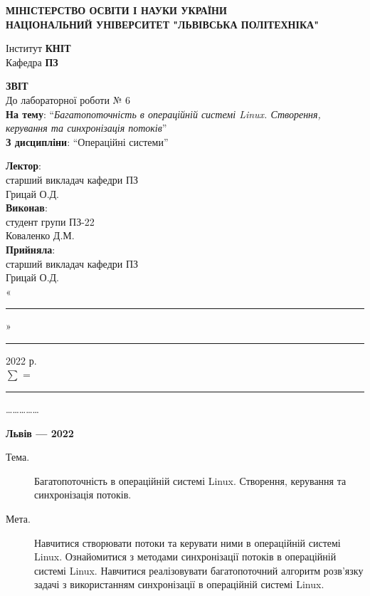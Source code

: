 \documentclass{article}
\newcommand\subject{Операційні системи}
\newcommand\lecturer{старший викладач кафедри ПЗ\\Грицай О.Д.}
\newcommand\teacher{старший викладач кафедри ПЗ\\Грицай О.Д.}
\newcommand\mygroup{ПЗ-22}
\newcommand\lab{6}
\newcommand\theme{Багатопоточність в операційній системі Linux. Створення,
	керування та синхронізація потоків}
\newcommand\purpose{Навчитися створювати потоки та керувати ними в операційній
	системі Linux. Ознайомитися з методами синхронізації потоків в операційній
	системі Linux. Навчитися реалізовувати багатопоточний алгоритм розв’язку
	задачі з використанням синхронізації в операційній системі Linux}
\begin{document}
\begin{normalsize}
	\begin{titlepage}
		\thispagestyle{empty}
		\begin{center}
			\textbf{МІНІСТЕРСТВО ОСВІТИ І НАУКИ УКРАЇНИ\\
				НАЦІОНАЛЬНИЙ УНІВЕРСИТЕТ "ЛЬВІВСЬКА ПОЛІТЕХНІКА"}
		\end{center}
		\begin{flushright}
			Інститут \textbf{КНІТ}\\
			Кафедра \textbf{ПЗ}
		\end{flushright}
		\vspace{200pt}
		\begin{center}
			\textbf{ЗВІТ}\\
			\vspace{10pt}
			До лабораторної роботи № \lab\\
			\textbf{На тему}: “\textit{\theme}”\\
			\textbf{З дисципліни}: “\subject”
		\end{center}
		\vspace{112pt}
		\begin{flushright}
			
			\textbf{Лектор}:\\
			\lecturer\\
			\vspace{28pt}
			\textbf{Виконав}:\\
			
			студент групи \mygroup\\
			Коваленко Д.М.\\
			\vspace{28pt}
			\textbf{Прийняла}:\\
			
			\teacher\\
			
			\vspace{28pt}
			«\rule{1cm}{0.15mm}» \rule{1.5cm}{0.15mm} 2022 р.\\
			$\sum$ = \rule{1cm}{0.15mm}……………\\
			
		\end{flushright}
		\vspace{\fill}
		\begin{center}
			\textbf{Львів — 2022}
		\end{center}
	\end{titlepage}
		
	\begin{description}
		\item[Тема.] \theme.
		\item[Мета.] \purpose.
	\end{description}


\end{normalsize}
\end{document}
